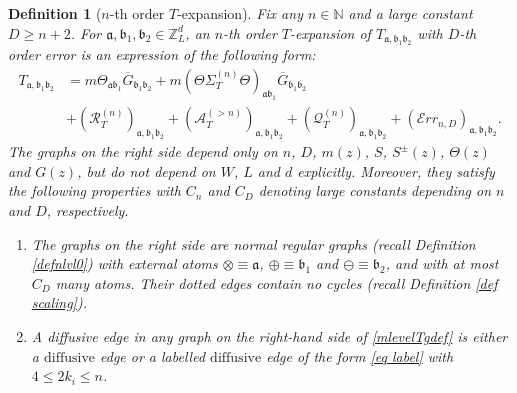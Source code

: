 \documentclass{article}
\newcommand{\1}{\mathds{1}}
\numberwithin{equation}{section}
\newcommand{\be}{\begin{equation}}
\newcommand{\ee}{\end{equation}}
\newcommand{\fa}{{\mathfrak a}}
\newcommand{\fb}{{\mathfrak b}}
\renewcommand{\leq}{\leqslant}
\renewcommand{\geq}{\geqslant}
\renewcommand{\le}{\leq}
\renewcommand{\ge}{\geq}
\newcommand{\N}{\mathbb{N}}
\newcommand{\Z}{\mathbb{Z}}
\newcommand{\dashed}{\text{diffusive}}
\newcommand{\selfs}{\text{self-energies}}
\DeclareMathOperator{\OO}{O}
\theoremstyle{plain} %
\newtheorem{definition}[theorem]{Definition}
\theoremstyle{remark}
\newcommand{\Sdelta}{{\Sigma}_T}
\newcommand{\PTn}{\mathcal R_T^{(n)}}
\newcommand{\QTn}{\mathcal Q_T^{(n)}}
\newcommand{\ATn}{\mathcal A_T^{(>n)}}
\newcommand{\Err}{{\mathcal Err}}
\begin{document}
\begin{definition} [$n$-th order $T$-expansion]\label{defn genuni}
	Fix any $n\in \N$ and a large constant $D\ge n+2$. For $\fa, \fb_1,\fb_2 \in \Z_L^d$, an $n$-th order $T$-expansion of $T_{\fa,\fb_1\fb_2}$ with $D$-th order error is an expression of the following form: %
	\be\label{mlevelTgdef}
	\begin{split}
		T_{\fa,\fb_1 \fb_2}&= m  \Theta_{\fa \fb_1}\overline G_{\fb_1\fb_2} +m   (\Theta \Sdelta^{(n)}\Theta)_{\fa\fb_1} \overline G_{\fb_1\fb_2} \\
		&+ (\PTn)_{\fa,\fb_1 \fb_2} +  (\ATn)_{\fa,\fb_1\fb_2}  + (\QTn)_{\fa,\fb_1\fb_2}  +  (\Err_{n,D})_{\fa,\fb_1\fb_2}.
	\end{split}
	\ee
	The graphs on the right side depend only on $n$, $D$, $m(z)$, $S$, $S^{\pm}(z)$, $\Theta(z)$ and $G(z)$, but do not depend on $W$, $L$ and $d$ explicitly. Moreover, they satisfy the following properties with $C_n$ and $C_D$ denoting large constants depending on $n$ and $D$, respectively.
	\begin{enumerate}
		\item  The graphs on the right side are normal regular graphs (recall Definition \ref{defnlvl0}) with external atoms $\otimes\equiv \fa$, $\oplus\equiv \fb_1$ and $\ominus\equiv \fb_2$, and with at most $C_D$ many atoms. Their dotted edges contain no cycles (recall Definition \ref{def scaling}).
		
		\item %
		A diffusive edge in any graph on the right-hand side of \eqref{mlevelTgdef} is either a $\dashed$ edge or a labelled $\dashed$ edge of the form \eqref{eq label} with $4\le 2k_i \le n$.
		

\end{enumerate}
\end{definition}
\end{document}
